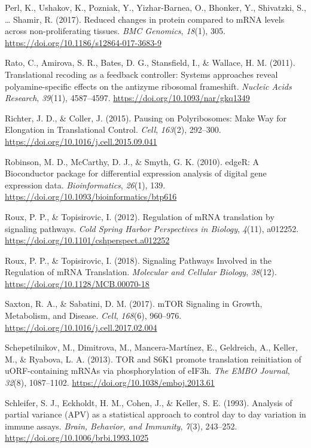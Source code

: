 \documentclass[12pt,openany]{book}
\begin{document}
\hypertarget{ref-Perl2017}{}
Perl, K., Ushakov, K., Pozniak, Y., Yizhar-Barnea, O., Bhonker, Y.,
Shivatzki, S., \ldots{} Shamir, R. (2017). Reduced changes in protein
compared to mRNA levels across non-proliferating tissues. \emph{BMC
Genomics}, \emph{18}(1), 305.
\url{https://doi.org/10.1186/s12864-017-3683-9}

\hypertarget{ref-Rato2011}{}
Rato, C., Amirova, S. R., Bates, D. G., Stansfield, I., \& Wallace, H.
M. (2011). Translational recoding as a feedback controller: Systems
approaches reveal polyamine-specific effects on the antizyme ribosomal
frameshift. \emph{Nucleic Acids Research}, \emph{39}(11), 4587--4597.
\url{https://doi.org/10.1093/nar/gkq1349}

\hypertarget{ref-Richter2015}{}
Richter, J. D., \& Coller, J. (2015). Pausing on Polyribosomes: Make Way
for Elongation in Translational Control. \emph{Cell}, \emph{163}(2),
292--300. \url{https://doi.org/10.1016/j.cell.2015.09.041}

\hypertarget{ref-Robinson2010}{}
Robinson, M. D., McCarthy, D. J., \& Smyth, G. K. (2010). edgeR: A
Bioconductor package for differential expression analysis of digital
gene expression data. \emph{Bioinformatics}, \emph{26}(1), 139.
\url{https://doi.org/10.1093/bioinformatics/btp616}

\hypertarget{ref-Roux2012}{}
Roux, P. P., \& Topisirovic, I. (2012). Regulation of mRNA translation
by signaling pathways. \emph{Cold Spring Harbor Perspectives in
Biology}, \emph{4}(11), a012252.
\url{https://doi.org/10.1101/cshperspect.a012252}

\hypertarget{ref-Roux2018}{}
Roux, P. P., \& Topisirovic, I. (2018). Signaling Pathways Involved in
the Regulation of mRNA Translation. \emph{Molecular and Cellular
Biology}, \emph{38}(12). \url{https://doi.org/10.1128/MCB.00070-18}

\hypertarget{ref-Saxton2017}{}
Saxton, R. A., \& Sabatini, D. M. (2017). mTOR Signaling in Growth,
Metabolism, and Disease. \emph{Cell}, \emph{168}(6), 960--976.
\url{https://doi.org/10.1016/j.cell.2017.02.004}

\hypertarget{ref-Schepetilnikov2013}{}
Schepetilnikov, M., Dimitrova, M., Mancera-Martínez, E., Geldreich, A.,
Keller, M., \& Ryabova, L. A. (2013). TOR and S6K1 promote translation
reinitiation of uORF-containing mRNAs via phosphorylation of eIF3h.
\emph{The EMBO Journal}, \emph{32}(8), 1087--1102.
\url{https://doi.org/10.1038/emboj.2013.61}

\hypertarget{ref-Schleifer1993}{}
Schleifer, S. J., Eckholdt, H. M., Cohen, J., \& Keller, S. E. (1993).
Analysis of partial variance (APV) as a statistical approach to control
day to day variation in immune assays. \emph{Brain, Behavior, and
Immunity}, \emph{7}(3), 243--252.
\url{https://doi.org/10.1006/brbi.1993.1025}
\end{document}
